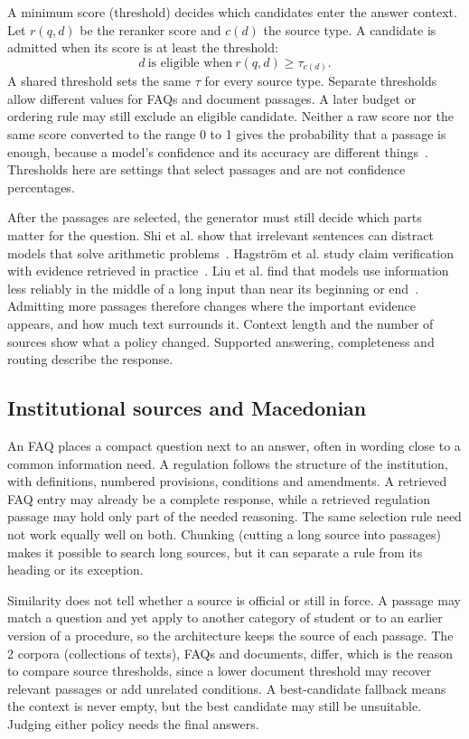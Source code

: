 

A minimum score (threshold) decides which candidates enter the answer context. Let $r(q,d)$ be the reranker score and $c(d)$ the source type. A candidate is admitted when its score is at least the threshold:
\[
  d\ \text{is eligible when}\ r(q,d)\geq\tau_{c(d)}.
\]
A shared threshold sets the same $\tau$ for every source type. Separate thresholds allow different values for FAQs and document passages. A later budget or ordering rule may still exclude an eligible candidate. Neither a raw score nor the same score converted to the range 0 to 1 gives the probability that a passage is enough, because a model's confidence and its accuracy are different things~\cite{guo2017calibration}. Thresholds here are settings that select passages and are not confidence percentages.

After the passages are selected, the generator must still decide which parts matter for the question. Shi et al. show that irrelevant sentences can distract models that solve arithmetic problems~\cite{shi2023distracted}. Hagstr\"om et al. study claim verification with evidence retrieved in practice~\cite{hagstrom2025reality}. Liu et al. find that models use information less reliably in the middle of a long input than near its beginning or end~\cite{liu2024lost}. Admitting more passages therefore changes where the important evidence appears, and how much text surrounds it. Context length and the number of sources show what a policy changed. Supported answering, completeness and routing describe the response.

\subsection{Institutional sources and Macedonian}

An FAQ places a compact question next to an answer, often in wording close to a common information need. A regulation follows the structure of the institution, with definitions, numbered provisions, conditions and amendments. A retrieved FAQ entry may already be a complete response, while a retrieved regulation passage may hold only part of the needed reasoning. The same selection rule need not work equally well on both. Chunking (cutting a long source into passages) makes it possible to search long sources, but it can separate a rule from its heading or its exception.

Similarity does not tell whether a source is official or still in force. A passage may match a question and yet apply to another category of student or to an earlier version of a procedure, so the architecture keeps the source of each passage. The 2 corpora (collections of texts), FAQs and documents, differ, which is the reason to compare source thresholds, since a lower document threshold may recover relevant passages or add unrelated conditions. A best-candidate fallback means the context is never empty, but the best candidate may still be unsuitable. Judging either policy needs the final answers.

